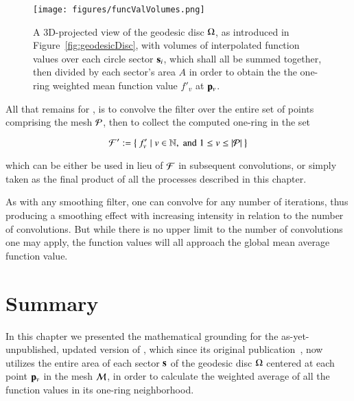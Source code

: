 \begin{figure}[ht]
\ffigbox
	{\texttt{[image: figures/funcValVolumes.png]}}
	{\caption[Weighted Mean Function Value $f'_v$at $\bp_v$]{A 3D-projected view of the geodesic disc $\Omega$, as introduced in Figure~\ref{fig:geodesicDisc}, with volumes of interpolated function values over each circle sector $\mathbf{s}_i$, which shall all be summed together, then divided by each sector's area $A$ in order to obtain the the one-ring weighted mean function value $f'_v$ at $\bp_v$.}\label{fig:funcValVolumes}}
\end{figure}

All that remains for , is to convolve the filter over the entire set of points comprising the mesh $\mathcal{P}$, then to collect the computed one-ring  in the set

\begin{equation}
	\mathcal{F}' :=  \left \{\:f'_v \mid v \in \mathbb{N}, \;\text{and}\; 1\leq v \leq |\mathcal{P}|\:\right \}
	\label{eq:setFprime}
\end{equation}%
%

which can be either be used in lieu of $\mathcal{F}$ in subsequent convolutions, or simply taken as the final product of all the processes described in this chapter.

As with any smoothing filter, one can convolve  for any number of iterations, thus producing a smoothing effect with increasing intensity in relation to the number of convolutions. But while there is no upper limit to the number of convolutions one may apply, the function values will all approach the global mean average function value.%

%
%
%
%
\section{Summary}
In this chapter we presented the mathematical grounding for the as-yet-unpublished, updated version of , which since its original publication~\cite[s.~3.2]{Mara17}, now utilizes the entire area of each sector $\mathbf{s}$ of the geodesic disc $\Omega$ centered at each point $\bp_v$ in the mesh $\mathcal{M}$, in order to calculate the weighted average of all the function values in its one-ring neighborhood.

